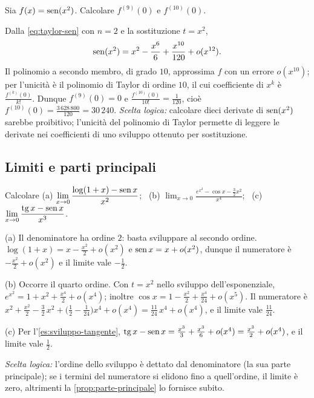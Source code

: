 \begin{esercizio}\label{es:derivata-decima}
Sia $f(x)=\operatorname{sen}(x^{2})$. Calcolare $f^{(9)}(0)$ e $f^{(10)}(0)$.
\begin{soluzione}
Dalla \eqref{eq:taylor-sen} con $n=2$ e la sostituzione $t=x^{2}$,
\[
  \operatorname{sen}(x^{2})=x^{2}-\frac{x^{6}}6+\frac{x^{10}}{120}+o(x^{12}) .
\]
Il polinomio a secondo membro, di grado $10$, approssima $f$ con un errore $o(x^{10})$; per
l'unicità è il polinomio di Taylor di ordine $10$, il cui coefficiente di $x^{k}$ è
$\frac{f^{(k)}(0)}{k!}$. Dunque $f^{(9)}(0)=0$ e $\frac{f^{(10)}(0)}{10!}=\frac1{120}$, cioè
$f^{(10)}(0)=\frac{3\,628\,800}{120}=30\,240$. \emph{Scelta logica:} calcolare dieci derivate di
$\operatorname{sen}(x^{2})$ sarebbe proibitivo; l'unicità del polinomio di Taylor permette di leggere le
derivate nei coefficienti di uno sviluppo ottenuto per sostituzione.
\end{soluzione}
\end{esercizio}

\subsection*{Limiti e parti principali}

\begin{esercizio}
Calcolare (a) $\displaystyle\lim_{x\to0}\frac{\log(1+x)-\operatorname{sen} x}{x^{2}}$; \
(b) $\displaystyle\lim_{x\to0}\frac{e^{x^{2}}-\cos x-\frac32x^{2}}{x^{4}}$; \
(c) $\displaystyle\lim_{x\to0}\frac{\operatorname{tg} x-\operatorname{sen} x}{x^{3}}$.
\begin{soluzione}
(a) Il denominatore ha ordine $2$: basta sviluppare al secondo ordine.
$\log(1+x)=x-\frac{x^{2}}2+o(x^{2})$ e $\operatorname{sen} x=x+o(x^{2})$, dunque il numeratore è
$-\frac{x^{2}}2+o(x^{2})$ e il limite vale $-\frac12$.

(b) Occorre il quarto ordine. Con $t=x^{2}$ nello sviluppo dell'esponenziale,
$e^{x^{2}}=1+x^{2}+\frac{x^{4}}2+o(x^{4})$; inoltre $\cos x=1-\frac{x^{2}}2+\frac{x^{4}}{24}+o(x^{5})$. Il
numeratore è
$x^{2}+\frac{x^{2}}2-\frac32\,x^{2}+\bigl(\frac12-\frac1{24}\bigr)x^{4}+o(x^{4})=\frac{11}{24}\,x^{4}+o(x^{4})$, e il
limite vale $\frac{11}{24}$.

(c) Per l'\cref{es:sviluppo-tangente}, $\operatorname{tg} x-\operatorname{sen} x=\frac{x^{3}}3+\frac{x^{3}}6+o(x^{4})=\frac{x^{3}}2+o(x^{4})$, e
il limite vale $\frac12$.

\emph{Scelta logica:} l'ordine dello sviluppo è dettato dal denominatore (la sua parte
principale); se i termini del numeratore si elidono fino a quell'ordine, il limite è
zero, altrimenti la \cref{prop:parte-principale} lo fornisce subito.
\end{soluzione}
\end{esercizio}

